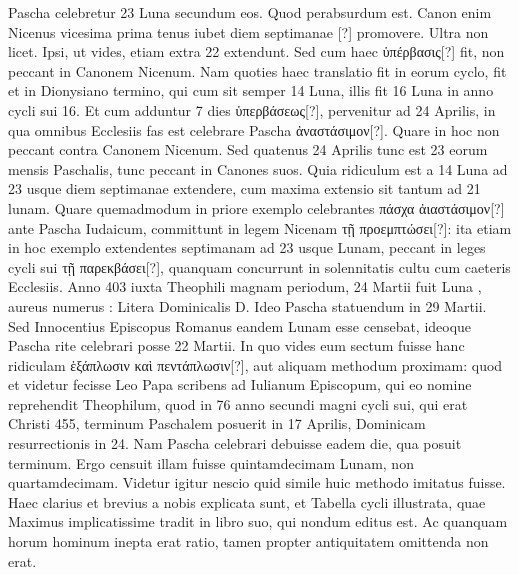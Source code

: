 Pascha celebretur 23 Luna secundum eos.
Quod perabsurdum est.
Canon enim Nicenus vicesima prima tenus iubet diem septimanae [?]
promovere.
Ultra non licet.
Ipsi, ut vides, etiam extra 22 extendunt.
Sed cum haec \textgreek{ὑπέρβασις[?]} fit,
 non peccant in Canonem Nicenum.
Nam quoties haec translatio fit in eorum cyclo, fit et in Dionysiano
termino, qui cum sit semper 14 Luna, illis fit 16 Luna in anno cycli
sui 16.
Et cum adduntur 7 dies \textgreek{ὑπερβάσεως[?]}, pervenitur ad 24
Aprilis, in qua omnibus Ecclesiis fas est celebrare Pascha
 \textgreek{ἀναστάσιμον[?]}.
Quare in hoc non peccant contra Canonem Nicenum.
Sed quatenus
24 Aprilis tunc est 23 eorum mensis Paschalis, tunc peccant in Canones
suos. %
Quia ridiculum est a 14 Luna ad 23 usque diem septimanae
extendere,
cum maxima extensio sit tantum ad 21 lunam.
Quare quemadmodum in priore exemplo celebrantes
 \textgreek{πάσχα ἀιαστάσιμον[?]}
ante Pascha Iudaicum, committunt in legem Nicenam \textgreek{τῇ προεμπτώσει[?]}:
ita etiam in hoc exemplo extendentes septimanam ad 23 usque
Lunam, peccant in leges cycli sui \textgreek{τῇ παρεκβάσει[?]}, quanquam
concurrunt in solennitatis cultu cum caeteris Ecclesiis.
Anno 403
iuxta Theophili magnam periodum, 24 Martii fuit Luna , aureus
numerus : Litera Dominicalis \textsc{D}.
Ideo Pascha statuendum
in 29 Martii.
Sed Innocentius Episcopus Romanus eandem Lunam
 esse censebat, ideoque Pascha rite celebrari posse 22 Martii.
In quo vides eum sectum fuisse hanc ridiculam
 \textgreek{ἑξάπλωσιν καὶ πεντάπλωσιν[?]},
aut aliquam methodum proximam: quod et videtur fecisse
Leo Papa scribens ad Iulianum Episcopum, qui eo nomine reprehendit
Theophilum, quod in 76 anno secundi magni cycli sui,
qui erat Christi 455, terminum Paschalem posuerit in 17 Aprilis,
Dominicam resurrectionis in 24.
%
Nam Pascha celebrari debuisse
eadem die, qua posuit terminum.
Ergo censuit illam fuisse quintamdecimam
Lunam, non quartamdecimam.
Videtur igitur nescio
quid simile huic methodo imitatus fuisse.
Haec clarius et brevius
a nobis explicata sunt, et Tabella cycli illustrata, quae Maximus
implicatissime tradit in libro suo, qui nondum editus est.
Ac quanquam horum hominum inepta erat ratio, tamen propter antiquitatem
omittenda non erat.
%
